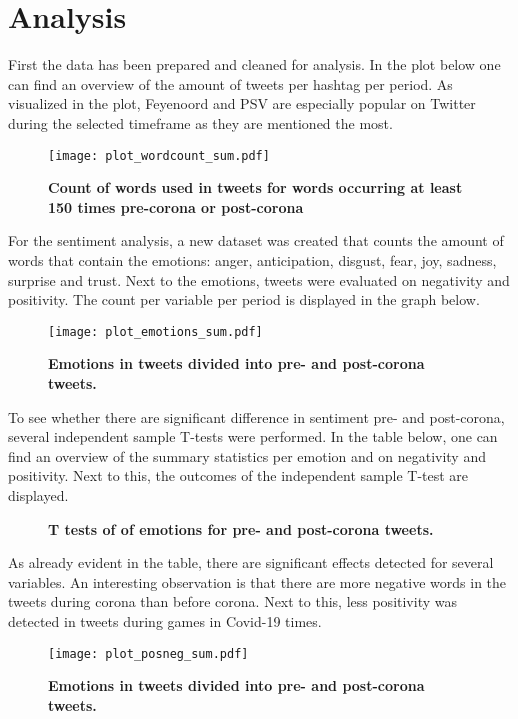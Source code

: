 \documentclass[12pt]{article}
\begin{document}
\section{Analysis}
First the data has been prepared and cleaned for analysis. In the plot below one can find an overview of the amount of tweets per hashtag per period. As visualized in the plot, Feyenoord and PSV are especially popular on Twitter during the selected timeframe as they are mentioned the most.

\begin{figure}[H]
\caption{\textbf{Count of words used in tweets for words occurring at least 150 times pre-corona or post-corona}}
\texttt{[image: plot\_wordcount\_sum.pdf]}

\end{figure}
For the sentiment analysis, a new dataset was created that counts the amount of words that contain the emotions: anger, anticipation, disgust, fear, joy, sadness, surprise and trust. Next to the emotions, tweets were evaluated on negativity and positivity. The count per variable per period is displayed in the graph below. 

\begin{figure}[H]
\caption{\textbf{Emotions in tweets divided into pre- and post-corona tweets.}}
\texttt{[image: plot\_emotions\_sum.pdf]}

\end{figure}
To see whether there are significant difference in sentiment pre- and post-corona, several independent sample T-tests were performed. In the table below, one can find an overview of the summary statistics per emotion and on negativity and positivity. Next to this, the outcomes of the independent sample T-test are displayed.  
 
\begin{figure}[H]
\caption{\textbf{T tests of of emotions for pre- and post-corona tweets.}}

\end{figure}
As already evident in the table, there are significant effects detected for several variables. An interesting observation is that there are more negative words in the tweets during corona than before corona. Next to this, less positivity was detected in tweets during games in Covid-19 times. 

\begin{figure}[H]
\caption{\textbf{Emotions in tweets divided into pre- and post-corona tweets.}}
\texttt{[image: plot\_posneg\_sum.pdf]}

\end{figure}


\nocite{*}

\end{document}
